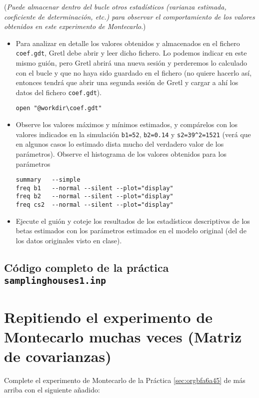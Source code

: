 \documentclass[11pt]{article}
\begin{document}
(\emph{Puede almacenar dentro del bucle otros estadísticos (varianza
estimada, coeficiente de determinación, etc.) para observar el
comportamiento de los valores obtenidos en este experimento de
Montecarlo}.)

\begin{itemize}
\item Para analizar en detalle los valores obtenidos y almacenados en el
fichero \texttt{coef.gdt}, Gretl debe abrir y leer dicho fichero. Lo
podemos indicar en este mismo guión, pero Gretl abrirá una nueva
sesión y perderemos lo calculado con el bucle y que no haya sido
guardado en el fichero (no quiere hacerlo así, entonces tendrá que
abrir una segunda sesión de Gretl y cargar a ahí los datos del
fichero \texttt{coef.gdt}).
\begin{verbatim}
open "@workdir\coef.gdt"
\end{verbatim}

\item Observe los valores máximos y mínimos estimados, y compárelos con
los valores indicados en la simulación \texttt{b1=52}, \texttt{b2=0.14} y
\texttt{s2=39\textasciicircum{}2=1521} (verá que en algunos casos lo estimado dista mucho
del verdadero valor de los parámetros). Observe el histograma de los
valores obtenidos para los parámetros
\begin{verbatim}
summary   --simple
freq b1   --normal --silent --plot="display"
freq b2   --normal --silent --plot="display"
freq cs2  --normal --silent --plot="display"
\end{verbatim}

\item Ejecute el guión y coteje los resultados de los estadísticos
descriptivos de los betas estimados con los parámetros estimados en
el modelo original (del de los datos originales visto en clase).
\end{itemize}

\vspace{10pt}
\noindent
\subsection{Código completo de la práctica \texttt{samplinghouses1.inp}}
\label{sec:org6635133}
\vspace{10pt}

\clearpage

\section{Repitiendo el experimento de Montecarlo muchas veces (Matriz de covarianzas)}
\label{sec:org910a0ae}
Complete el experimento de Montecarlo de la Práctica \ref{sec:orgbfa6a45} de más arriba con el
siguiente añadido:
\end{document}
